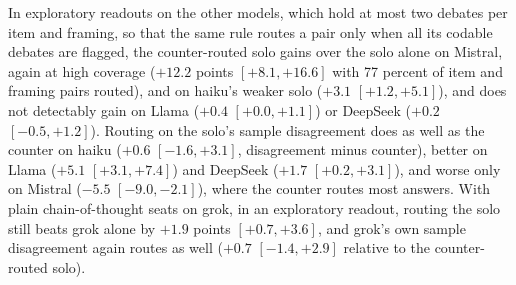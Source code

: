 In exploratory readouts on the other models, which hold at most two debates
per item and framing, so that the same rule routes a pair only when all its
codable debates are flagged, the counter-routed solo gains over the solo
alone on Mistral, again at high coverage ($+12.2$ points $[+8.1, +16.6]$ with
77 percent of item and framing pairs routed), and on haiku's weaker solo
($+3.1$ $[+1.2, +5.1]$), and does not detectably gain on Llama ($+0.4$
$[+0.0, +1.1]$) or DeepSeek ($+0.2$ $[-0.5, +1.2]$). Routing on the solo's
sample disagreement does as well as the counter on haiku ($+0.6$
$[-1.6, +3.1]$, disagreement minus counter), better on Llama ($+5.1$
$[+3.1, +7.4]$) and DeepSeek ($+1.7$ $[+0.2, +3.1]$), and worse only on
Mistral ($-5.5$ $[-9.0, -2.1]$), where the counter routes most answers.
With plain chain-of-thought seats on grok, in an exploratory readout, routing
the solo still beats grok alone by $+1.9$ points $[+0.7, +3.6]$, and grok's
own sample disagreement again routes as well ($+0.7$ $[-1.4, +2.9]$ relative
to the counter-routed solo).


